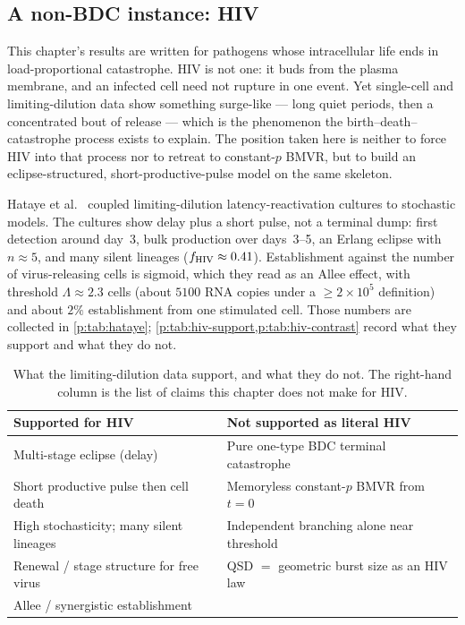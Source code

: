 \subsection{A non-BDC instance: HIV}
\label{p:sec:hiv}

This chapter's results are written for pathogens whose intracellular life
ends in load-proportional catastrophe. HIV is not one: it buds from the
plasma membrane, and an infected cell need not rupture in one event. Yet
single-cell and limiting-dilution data show something surge-like --- long
quiet periods, then a concentrated bout of release --- which is the
phenomenon the birth--death--catastrophe process exists to explain. The position
taken here is neither to force HIV into that process nor to retreat to
constant-$p$ BMVR, but to build an eclipse-structured,
short-productive-pulse model on the same skeleton.

Hataye et al.\ \cite{hataye2019principles} coupled limiting-dilution
latency-reactivation cultures to stochastic models. The cultures show delay
plus a short pulse, not a terminal dump: first detection around day~3, bulk
production over days~3--5, an Erlang eclipse with $n\approx5$, and many
silent lineages ($f_{\rm HIV}\approx0.41$). Establishment against the number
of virus-releasing cells is sigmoid, which they read as an Allee effect,
with threshold $\Lambda\approx2.3$ cells (about $5100$ RNA copies under a
$\ge2\times10^5$ definition) and about $2\%$ establishment from one
stimulated cell. Those numbers are collected in \cref{p:tab:hataye};
\cref{p:tab:hiv-support,p:tab:hiv-contrast} record what they support and
what they do not.

\begin{table}[htbp]
\centering
\renewcommand{\arraystretch}{1.12}
\small
\begin{tabular}{@{}p{}p{}@{}}
\toprule
Supported for HIV & Not supported as literal HIV \\
\midrule
Multi-stage eclipse (delay) & Pure one-type BDC terminal catastrophe \\
Short productive pulse then cell death & Memoryless constant-$p$ BMVR from $t=0$ \\
High stochasticity; many silent lineages & Independent branching alone near threshold \\
Renewal / stage structure for free virus & QSD $=$ geometric burst size as an HIV law \\
Allee / synergistic establishment & \\
\bottomrule
\end{tabular}
\caption{What the limiting-dilution data support, and what they do not.
The right-hand column is the list of claims this chapter does not make for
HIV.}
\label{p:tab:hiv-support}
\end{table}

